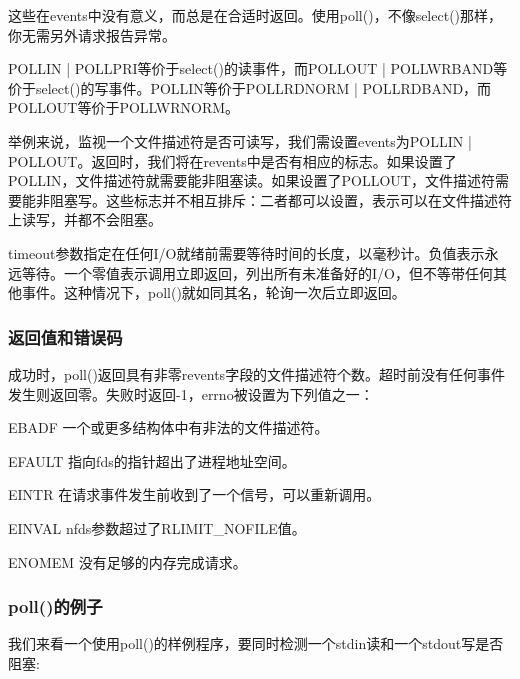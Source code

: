 这些在events中没有意义，而总是在合适时返回。使用poll()，不像select()那样，你无需另外请求报告异常。 

POLLIN | POLLPRI等价于select()的读事件，而POLLOUT | POLLWRBAND等价于select()的写事件。POLLIN等价于POLLRDNORM | POLLRDBAND，而POLLOUT等价于POLLWRNORM。

举例来说，监视一个文件描述符是否可读写，我们需设置events为POLLIN | POLLOUT。返回时，我们将在revents中是否有相应的标志。如果设置了POLLIN，文件描述符就需要能非阻塞读。如果设置了POLLOUT，文件描述符需要能非阻塞写。这些标志并不相互排斥：二者都可以设置，表示可以在文件描述符上读写，并都不会阻塞。

timeout参数指定在任何I/O就绪前需要等待时间的长度，以毫秒计。负值表示永远等待。一个零值表示调用立即返回，列出所有未准备好的I/O，但不等带任何其他事件。这种情况下，poll()就如同其名，轮询一次后立即返回。 

\subsubsection{返回值和错误码}

成功时，poll()返回具有非零revents字段的文件描述符个数。超时前没有任何事件发生则返回零。失败时返回-1，errno被设置为下列值之一： 

\begin{eqlist*}
\item [EBADF]
一个或更多结构体中有非法的文件描述符。
\item [EFAULT]
指向fds的指针超出了进程地址空间。 
\item [EINTR]
在请求事件发生前收到了一个信号，可以重新调用。
\item [EINVAL]
nfds参数超过了RLIMIT\_NOFILE值。 
\item [ENOMEM]
没有足够的内存完成请求。
\end{eqlist*}

\subsubsection{poll()的例子}

我们来看一个使用poll()的样例程序，要同时检测一个stdin读和一个stdout写是否阻塞: 

